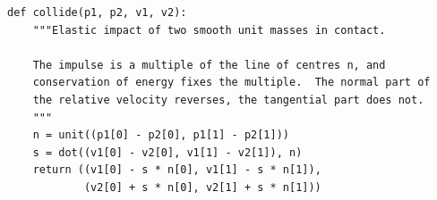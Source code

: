 \begin{verbatim}
def collide(p1, p2, v1, v2):
    """Elastic impact of two smooth unit masses in contact.

    The impulse is a multiple of the line of centres n, and
    conservation of energy fixes the multiple.  The normal part of
    the relative velocity reverses, the tangential part does not.
    """
    n = unit((p1[0] - p2[0], p1[1] - p2[1]))
    s = dot((v1[0] - v2[0], v1[1] - v2[1]), n)
    return ((v1[0] - s * n[0], v1[1] - s * n[1]),
            (v2[0] + s * n[0], v2[1] + s * n[1]))
\end{verbatim}
